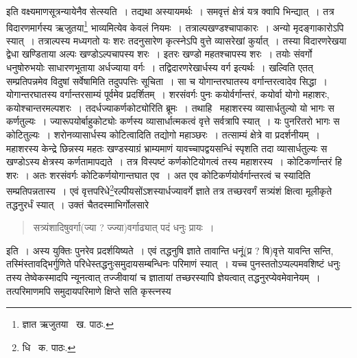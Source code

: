 \documentclass[11pt, openany]{book}
\begin{document}
\noindent इति वक्ष्यमाणसूत्रन्यायेनैव सेत्स्यति~। तद्यथा अस्यायमर्थः~। समवृत्तं क्षेत्रं यत्र क्वापि भिन्द्यात्~। तत्र विदारणमार्गस्य ऋजुतया\renewcommand{\thefootnote}{१}\footnote{ज्ञात ऋजुतया \textendash\ ख. पाठः.} भाव्यमित्येव केवलं नियमः~। तत्राल्पखण्डश्चापाकारः~। अन्यो मृदङ्गाकारोऽपि स्यात्~। तत्राल्पस्य मध्यगतो यः शरः तदनुसारेण कृत्स्नेऽपि वुत्ते व्यासरेखां कुर्यात्~। तस्या विदारणरेखया द्वेधा खण्डिताया अल्पः खण्डोऽल्पचापस्य शरः~। इतरः खण्डो महतश्चापस्य शरः~। तयोः संवर्गो धनुषोरुभयोः साधारणभूताया अर्धज्याया वर्गः~। तद्विदारणरेखार्धस्य वर्ग इत्यर्थः~। खल्विति एतत् सम्प्रतिपन्नमेव विदुषां सर्वेषामिति तदुपपत्तिः सूचिता~। सा च योगान्तरघातस्य वर्गान्तरत्वादेव सिद्धा~। योगान्तरघातस्य वर्गान्तरसाम्यं पूर्वमेव प्रदर्शितम्~। शरसंवर्गः पुनः कयोर्वर्गान्तरं, कयोर्वा योगो महाशरः, कयोश्चान्तरमल्पशरः~। तदर्धज्याकर्णकोट्योरिति ब्रूमः~। तथाहि \textendash\ महाशरस्य व्यासार्धतुल्यो यो भागः स कर्णतुल्यः~। ज्यारूपयोर्बाहुकोट्योः कर्णस्य व्यासार्धात्मकत्वं वृत्ते सर्वत्रापि स्यात्~। यः पुनरितरो भागः स कोटितुल्यः~। शरोनव्यासार्धस्य कोटित्वादिति तद्योगो महाञ्छरः~। तत्साम्यं क्षेत्रे वा प्रदर्शनीयम्~। महाशरस्य केन्द्रे छिन्नस्य महतः खण्डस्याग्रं भ्राम्यमाणं
यावच्चापद्वयसन्धिं स्पृशति तदा व्यासार्धतुल्यः स खण्डोऽस्य क्षेत्रस्य कर्णतामापद्यते~। तत्र विस्पष्टं कर्णकोटियोगत्वं तस्य महाशरस्य~। कोटिकर्णान्तरं हि शरः~। अतः शरसंवर्गः कोटिकर्णयोगान्तघात एव~। अत एव कोटिकर्णयोर्वर्गान्तरत्वं च स्यादिति सम्प्रतिपन्नतास्य~। एवं
वृत्तपरिधे\renewcommand{\thefootnote}{२}\footnote{धि \textendash\ क. पाठः.}रल्पीयसोंऽशस्यार्धज्यावर्गे ज्ञाते तत्र तच्छरवर्गं सत्र्यंशं क्षित्वा मूलीकृते तद्धनुरर्धं स्यात्~। उक्तं चैतदस्माभिर्गोलसारे\textendash

\begin{quote}
{\qt सत्र्यंशादिषुवर्गा(ज्या ? ज्ज्या)वर्गाढ्यात् पदं धनुः प्रायः~।}
\end{quote}

\noindent इति~। अस्य युक्तिः पुनरेव प्रदर्शयिष्यते~। एवं तद्धनुषि ज्ञाते तावान्ति धनूं(प्र ? षि)वृत्ते यावन्ति सन्ति, तस्मिंस्तावद्भिर्गुणिते
परिधेस्तद्धनुःसमुदायसम्बन्धिनः परिमाणं स्यात्~। यच्च पुनस्ततोऽप्यल्पमवशिष्टं धनुः तस्य तेष्वेकस्मादपि न्यूनत्वात् तज्जीवायां च ज्ञातायां तच्छरस्यापि ज्ञेयत्वात् तद्धनुरप्येवमेवानेयम्~। तत्परिमाणमपि समुदायपरिमाणे क्षिप्ते सति कृस्त्नस्य

\newpage
\end{document}
